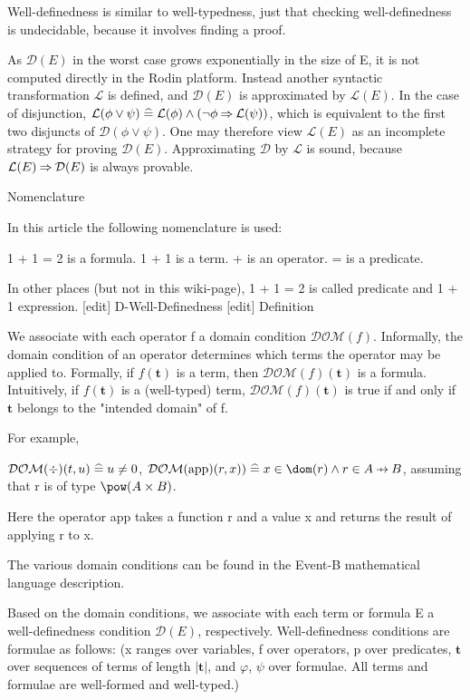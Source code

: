 Well-definedness is similar to well-typedness, just that checking well-definedness is undecidable, because it involves finding a proof.

As $\mathcal{D}(E)$ in the worst case grows exponentially in the size of E, it is not computed directly in the Rodin platform. Instead another syntactic transformation $\mathcal{L}$ is defined, and $\mathcal{D}(E)$ is approximated by $\mathcal{L}(E)$. In the case of disjunction, $\mathcal{L}(\phi\lor\psi)\mathrel{\widehat=}\mathcal{L}(\phi)\land(\lnot\phi\mathbin\Rightarrow\mathcal{L}(\psi))$, which is equivalent to the first two disjuncts of $\mathcal{D}(\phi\lor\psi)$. One may therefore view $\mathcal{L}(E)$ as an incomplete strategy for proving $\mathcal{D}(E)$. Approximating $\mathcal{D}$ by $\mathcal{L}$ is sound, because $\mathcal{L}(E)\mathbin\Rightarrow\mathcal{D}(E)$ is always provable. 

Nomenclature

In this article the following nomenclature is used:

    1 + 1 = 2 is a formula.
    1 + 1 is a term.
    + is an operator.
    = is a predicate. 

In other places (but not in this wiki-page), 1 + 1 = 2 is called predicate and 1 + 1 expression.
[edit] D-Well-Definedness
[edit] Definition

We associate with each operator f a domain condition $\mathcal{DOM}(f)$. Informally, the domain condition of an operator determines which terms the operator may be applied to. Formally, if $f(\mathbf{t})$ is a term, then $\mathcal{DOM}(f)(\mathbf{t})$ is a formula. Intuitively, if $f(\mathbf{t})$ is a (well-typed) term, $\mathcal{DOM}(f)(\mathbf{t})$ is true if and only if $\mathbf{t}$ belongs to the "intended domain" of f.

For example,

    $\mathcal{DOM}(\div)(t, u) \mathrel{\widehat=} u \neq 0$,
    $\mathcal{DOM}(\mathrm{app})(r,x)) \defi x \in \dom(r) \land r \in A \pfun B$, assuming that r is of type $\pow(A \times B)$. 

Here the operator app takes a function r and a value x and returns the result of applying r to x.

The various domain conditions can be found in the Event-B mathematical language description.

Based on the domain conditions, we associate with each term or formula E a well-definedness condition $\mathcal{D}(E)$, respectively. Well-definedness conditions are formulae as follows:
(x ranges over variables, f over operators, p over predicates, $\mathbf{t}$ over sequences of terms of length $|\mathbf{t}|$, and $φ$, $ψ$ over formulae. All terms and formulae are well-formed and well-typed.)

